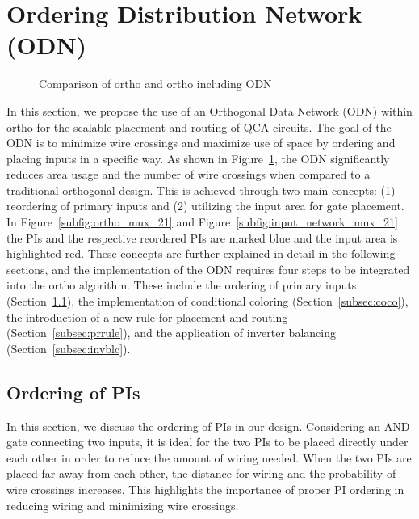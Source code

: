 \section{Ordering Distribution Network (ODN)}

\begin{figure}
	\centering
	\caption{Comparison of ortho and ortho including ODN}\label{fig:input_network_mux_21}
\end{figure}


In this section, we propose the use of an Orthogonal Data Network (ODN) within ortho for the scalable placement and routing of QCA circuits. The goal of the ODN is to minimize wire crossings and maximize use of space by ordering and placing inputs in a specific way. As shown in Figure~\ref{fig:input_network_mux_21}, the ODN significantly reduces area usage and the number of wire crossings when compared to a traditional orthogonal design. This is achieved through two main concepts: (1) reordering of primary inputs and (2) utilizing the input area for gate placement. In Figure~\ref{subfig:ortho_mux_21} and Figure~\ref{subfig:input_network_mux_21} the PIs and the respective reordered PIs are marked blue and the input area is highlighted red. These concepts are further explained in detail in the following sections, and the implementation of the ODN requires four steps to be integrated into the ortho algorithm. These include the ordering of primary inputs (Section~\ref{subsec:orderPI}), the implementation of conditional coloring (Section~\ref{subsec:coco}), the introduction of a new rule for placement and routing (Section~\ref{subsec:prrule}), and the application of inverter balancing (Section~\ref{subsec:invblc}).

\subsection{Ordering of PIs}\label{subsec:orderPI}

In this section, we discuss the ordering of PIs in our design. Considering an AND gate connecting two inputs, it is ideal for the two PIs to be placed directly under each other in order to reduce the amount of wiring needed. When the two PIs are placed far away from each other, the distance for wiring and the probability of wire crossings increases. This highlights the importance of proper PI ordering in reducing wiring and minimizing wire crossings.

